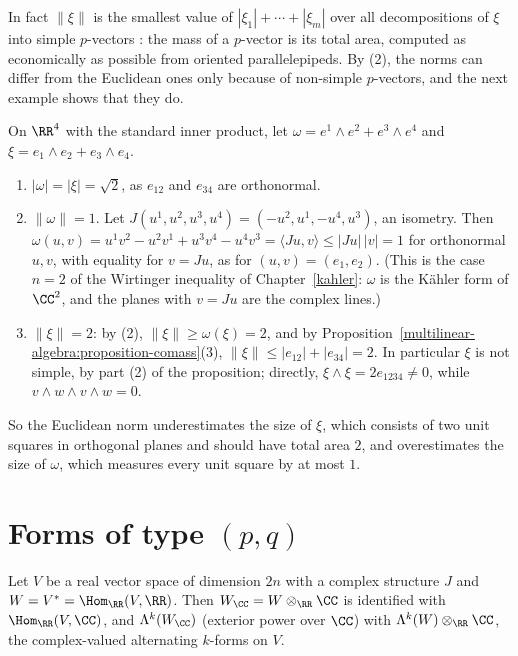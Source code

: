 In fact $\|\xi\|$ is the smallest value of $|\xi_1| + \cdots + |\xi_m|$ over all decompositions of $\xi$ into simple $p$-vectors \cite[1.8.1]{federer-gmt}: the mass of a $p$-vector is its total area, computed as
economically as possible from oriented parallelepipeds. By (2), the norms can differ from the Euclidean ones only because of non-simple $p$-vectors, and the next example shows that they do.

\begin{example}\label{multilinear-algebra:example-comass}
On $\RR^4$ with the standard inner product, let $\omega = e^1 \wedge e^2 + e^3 \wedge e^4$ and $\xi = e_1 \wedge e_2 + e_3 \wedge e_4$.
\begin{enumerate}
\item $|\omega| = |\xi| = \sqrt 2$, as $e_{12}$ and $e_{34}$ are orthonormal.
\item $\|\omega\| = 1$. Let $J(u^1, u^2, u^3, u^4) = (-u^2, u^1, -u^4, u^3)$, an isometry. Then $\omega(u, v) = u^1v^2 - u^2v^1 + u^3v^4 - u^4v^3 = \langle Ju, v\rangle \leq |Ju|\,|v| = 1$ for orthonormal $u, v$, with
equality for $v = Ju$, as for $(u, v) = (e_1, e_2)$. (This is the case $n = 2$ of the Wirtinger inequality of Chapter~\ref{kahler}: $\omega$ is the K\"ahler form of $\CC^2$, and the planes with $v = Ju$ are the complex
lines.)
\item $\|\xi\| = 2$: by (2), $\|\xi\| \geq \omega(\xi) = 2$, and by Proposition~\ref{multilinear-algebra:proposition-comass}(3), $\|\xi\| \leq |e_{12}| + |e_{34}| = 2$. In particular $\xi$ is not simple, by part (2) of the
proposition; directly, $\xi \wedge \xi = 2e_{1234} \neq 0$, while $v \wedge w \wedge v \wedge w = 0$.
\end{enumerate}
So the Euclidean norm underestimates the size of $\xi$, which consists of two unit squares in orthogonal planes and should have total area $2$, and overestimates the size of $\omega$, which measures every unit
square by at most $1$.
\end{example}

\section{Forms of type $(p,q)$}\label{multilinear-algebra:section-pq-forms}

Let $V$ be a real vector space of dimension $2n$ with a complex structure $J$ and $W = V^* = \Hom_\RR(V, \RR)$.
Then $W_\CC = W \otimes_\RR \CC$ is identified with $\Hom_\RR(V, \CC)$, and $\Lambda^k(W_\CC)$ (exterior power over $\CC$)
with $\Lambda^k(W) \otimes_\RR \CC$, the complex-valued alternating $k$-forms on $V$.

